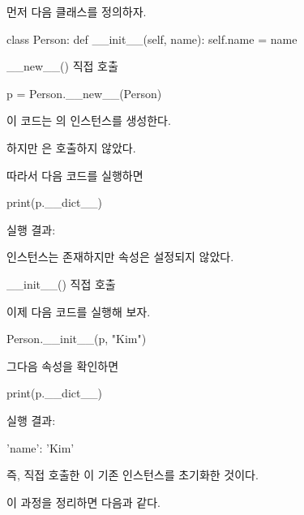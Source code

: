 먼저 다음 클래스를 정의하자.

\begin{dhkcode}
class Person:
    def __init__(self, name):
        self.name = name
\end{dhkcode}

\begin{dhknote}
\begin{dhksmry}[centered]
__new__() 직접 호출
\end{dhksmry}
\end{dhknote}

\begin{dhkcode}
p = Person.__new__(Person)
\end{dhkcode}

이 코드는 의 인스턴스를 생성한다.

하지만 은 호출하지 않았다.

따라서 다음 코드를 실행하면

\begin{dhkcode}
print(p.__dict__)
\end{dhkcode}

실행 결과:

\begin{dhkzsh}
{}
\end{dhkzsh}

인스턴스는 존재하지만  속성은 설정되지 않았다.

\begin{dhknote}
\begin{dhksmry}[centered]
__init__() 직접 호출
\end{dhksmry}
\end{dhknote}

이제 다음 코드를 실행해 보자.

\begin{dhkcode}
Person.__init__(p, "Kim")
\end{dhkcode}

그다음 속성을 확인하면

\begin{dhkcode}
print(p.__dict__)
\end{dhkcode}

실행 결과:

\begin{dhkzsh}
{'name': 'Kim'}
\end{dhkzsh}

즉, 직접 호출한 이 기존 인스턴스를 초기화한 것이다.

이 과정을 정리하면 다음과 같다.


